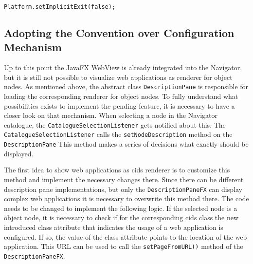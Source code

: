 \begin{lstlisting}[label=implicit_exit,caption=Disable JavaFX implicit exit]
Platform.setImplicitExit(false);
\end{lstlisting}

\subsection{Adopting the Convention over Configuration Mechanism}

Up to this point the JavaFX WebView is already integrated into the Navigator, but it is still not possible to visualize web applications as renderer for object nodes.
As mentioned above, the abstract class \texttt{DescriptionPane} is responsible for loading the corresponding renderer for object nodes.
To fully understand what possibilities exists to implement the pending feature, it is necessary to have a closer look on that mechanism.
When selecting a node in the Navigator catalogue, the \texttt{CatalogueSelectionListener} gets notified about this.
The \texttt{CatalogueSelectionListener} calls the \texttt{setNodeDescription} method on the \texttt{DescriptionPane}
This method makes a series of decisions what exactly should be displayed.
 
The first idea to show web applications as cids renderer is to customize this method and implement the necessary changes there.
Since there can be different description pane implementations, but only the \texttt{DescriptionPaneFX} can display complex web applications it is necessary to overwrite this method there.
The code needs to be changed to implement the following logic.
If the selected node is a object node, it is necessary to check if for the corresponding cids class the new introduced class attribute that indicates the usage of a web application is configured.
If so, the value of the class attribute  points to the location of the web application.
This URL can be used to call the \texttt{setPageFromURL()} method of the \texttt{DescriptionPaneFX}.

